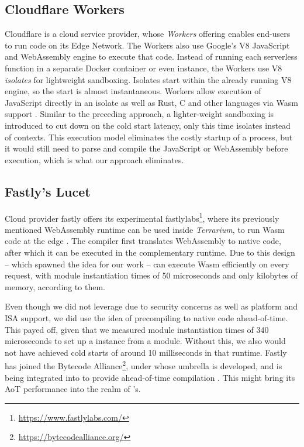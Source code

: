\subsection{Cloudflare Workers}

Cloudflare is a cloud service provider, whose \emph{Workers} offering enables end-users to run code on its Edge Network. The Workers also use Google's V8 JavaScript and WebAssembly engine to execute that code.
Instead of running each serverless function in a separate Docker container or even  instance, the Workers use V8 \emph{isolates} for lightweight sandboxing. Isolates start within the already running V8 engine, so the start is almost instantaneous.
Workers allow execution of JavaScript directly in an isolate as well as Rust, C and other languages via Wasm support \cite{Cloudflare2021}.
Similar to the preceding approach, a lighter-weight sandboxing is introduced to cut down on the cold start latency, only this time isolates instead of contexts. This execution model eliminates the costly startup of a  process, but it would still need to parse and compile the JavaScript or WebAssembly before execution, which is what our approach eliminates.


\subsection{Fastly's Lucet}

Cloud provider fastly offers its experimental fastlylabs\footnote{\url{https://www.fastlylabs.com/}}, where its previously mentioned  WebAssembly runtime can be used inside \emph{Terrarium}, to run Wasm code at the edge \cite{fastly2019}. The  compiler first translates WebAssembly to native code, after which it can be executed in the complementary runtime. Due to this design -- which spawned the idea for our work --  can execute Wasm efficiently on every request, with module instantiation times of 50 microseconds and only kilobytes of memory, according to them.

Even though we did not leverage  due to security concerns as well as platform and ISA support, we did use the idea of precompiling to native code ahead-of-time. This payed off, given that we measured module instantiation times of 340 microseconds to set up a  instance from a module. Without this, we also would not have achieved cold starts of around 10 milliseconds in that runtime.
Fastly has joined the Bytecode Alliance\footnote{\url{https://bytecodealliance.org/}}, under whose umbrella  is developed, and  is being integrated into  to provide ahead-of-time compilation \cite{Hickey2020}. This might bring its AoT performance into the realm of 's.

